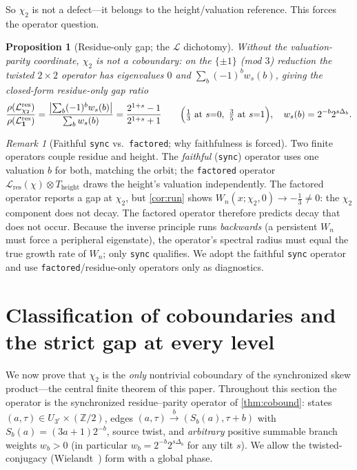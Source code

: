 \documentclass[11pt]{article}
\newcommand{\Z}{\mathbb{Z}}
\newcommand{\Lcal}{\mathcal{L}}
\newcommand{\UQ}{U_{3^r}}
\theoremstyle{plain}
\newtheorem{proposition}{Proposition}
\theoremstyle{definition}
\theoremstyle{remark}
\newtheorem*{remark}{Remark}
\begin{document}
So $\chi_2$ is not a defect---it belongs to the height/valuation reference. This
forces the operator question.

\begin{proposition}[Residue-only gap; the $\Lcal$ dichotomy]\label{prop:dich}
Without the valuation-parity coordinate, $\chi_2$ is not a coboundary: on the
$\{\pm1\}$ (mod $3$) reduction the twisted $2\times2$ operator has eigenvalues $0$
and $\sum_b(-1)^bw_s(b)$, giving the closed-form residue-only gap ratio
\[
\frac{\rho(\Lcal^{\mathrm{res}}_{\chi_2})}{\rho(\Lcal^{\mathrm{res}}_{\mathbf1})}
=\frac{\bigl|\sum_b(-1)^bw_s(b)\bigr|}{\sum_bw_s(b)}
=\frac{2^{1+s}-1}{2^{1+s}+1}
\qquad\Bigl(\tfrac13\text{ at }s{=}0,\ \tfrac35\text{ at }s{=}1\Bigr),
\quad w_s(b)=2^{-b}2^{s\Delta_b}.
\]
\end{proposition}

\begin{remark}[Faithful \texttt{sync} vs.\ \texttt{factored}; why faithfulness is forced]
Two finite operators couple residue and height. The \emph{faithful}
(\texttt{sync}) operator uses one valuation $b$ for both, matching the orbit; the
\texttt{factored} operator $\Lcal_{\mathrm{res}}(\chi)\otimes T_{\mathrm{height}}$
draws the height's valuation independently. The factored operator reports a gap
at $\chi_2$, but \cref{cor:run} shows $W_n(x;\chi_2,0)\to-\tfrac13\ne0$: the
$\chi_2$ component does not decay. The factored operator therefore predicts decay
that does not occur. Because the inverse principle runs \emph{backwards} (a
persistent $W_n$ must force a peripheral eigenstate), the operator's spectral
radius must equal the true growth rate of $W_n$; only \texttt{sync} qualifies. We
adopt the faithful \texttt{sync} operator and use \texttt{factored}/residue-only
operators only as diagnostics.
\end{remark}

\section{Classification of coboundaries and the strict gap at every level}
\label{sec:class}

We now prove that $\chi_2$ is the \emph{only} nontrivial coboundary of the
synchronized skew product---the central finite theorem of this paper. Throughout
this section the operator is the synchronized residue--parity operator of
\cref{thm:cobound}: states $(a,\tau)\in\UQ\times(\Z/2)$, edges
$(a,\tau)\xrightarrow{b}(S_b(a),\tau+b)$ with $S_b(a)=(3a+1)2^{-b}$, source twist,
and \emph{arbitrary} positive summable branch weights $w_b>0$ (in particular
$w_b=2^{-b}2^{s\Delta_b}$ for any tilt $s$). We allow the twisted-conjugacy
(Wielandt~\cite{wielandt1950}) form with a global phase.
\end{document}
